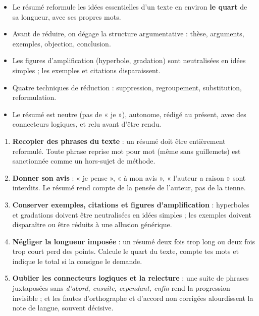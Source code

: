\documentclass[11pt]{article}
\newcommand{\cle}[1]{{\popxbold\color{popdark}#1}}
\begin{document}
\begin{aretenir}
\begin{itemize}
\item Le résumé reformule les \cle{idées essentielles} d'un texte en environ \textbf{le quart} de sa longueur, avec ses propres mots.
\item Avant de réduire, on dégage la \cle{structure argumentative} : thèse, arguments, exemples, objection, conclusion.
\item Les figures d'amplification (\cle{hyperbole}, \cle{gradation}) sont neutralisées en idées simples ; les exemples et citations disparaissent.
\item Quatre techniques de réduction : \cle{suppression}, \cle{regroupement}, \cle{substitution}, \cle{reformulation}.
\item Le résumé est neutre (pas de « je »), autonome, rédigé au présent, avec des connecteurs logiques, et relu avant d'être rendu.
\end{itemize}
\end{aretenir}

\begin{attention}
\begin{enumerate}
\item \textbf{Recopier des phrases du texte} : un résumé doit être entièrement reformulé. Toute phrase reprise mot pour mot (même sans guillemets) est sanctionnée comme un hors-sujet de méthode.
\item \textbf{Donner son avis} : « je pense », « à mon avis », « l'auteur a raison » sont interdits. Le résumé rend compte de la pensée de l'auteur, pas de la tienne.
\item \textbf{Conserver exemples, citations et figures d'amplification} : hyperboles et gradations doivent être neutralisées en idées simples ; les exemples doivent disparaître ou être réduits à une allusion générique.
\item \textbf{Négliger la longueur imposée} : un résumé deux fois trop long ou deux fois trop court perd des points. Calcule le quart du texte, compte tes mots et indique le total si la consigne le demande.
\item \textbf{Oublier les connecteurs logiques et la relecture} : une suite de phrases juxtaposées sans \emph{d'abord, ensuite, cependant, enfin} rend la progression invisible ; et les fautes d'orthographe et d'accord non corrigées alourdissent la note de langue, souvent décisive.
\end{enumerate}
\end{attention}
\end{document}
